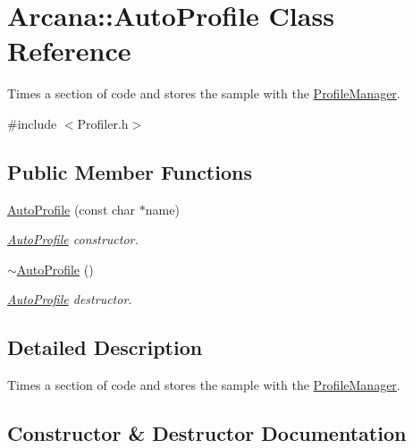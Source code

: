 \hypertarget{class_arcana_1_1_auto_profile}{}\section{Arcana\+:\+:Auto\+Profile Class Reference}
\label{class_arcana_1_1_auto_profile}


Times a section of code and stores the sample with the \mbox{\hyperlink{class_arcana_1_1_profile_manager}{Profile\+Manager}}.  




{\ttfamily \#include $<$Profiler.\+h$>$}

\subsection*{Public Member Functions}
\begin{DoxyCompactItemize}
\item 
\mbox{\hyperlink{class_arcana_1_1_auto_profile_abf2f032fe90f1fcbc5e0b54798520219}{Auto\+Profile}} (const char $\ast$name)
\begin{DoxyCompactList}\small\item\em \mbox{\hyperlink{class_arcana_1_1_auto_profile}{Auto\+Profile}} constructor. \end{DoxyCompactList}\item 
\mbox{\hyperlink{class_arcana_1_1_auto_profile_a16d83f6aa209f34c19661969f2717e19}{$\sim$\+Auto\+Profile}} ()
\begin{DoxyCompactList}\small\item\em \mbox{\hyperlink{class_arcana_1_1_auto_profile}{Auto\+Profile}} destructor. \end{DoxyCompactList}\end{DoxyCompactItemize}


\subsection{Detailed Description}
Times a section of code and stores the sample with the \mbox{\hyperlink{class_arcana_1_1_profile_manager}{Profile\+Manager}}. 

\subsection{Constructor \& Destructor Documentation}
\mbox{\label{class_arcana_1_1_auto_profile_abf2f032fe90f1fcbc5e0b54798520219}} 
